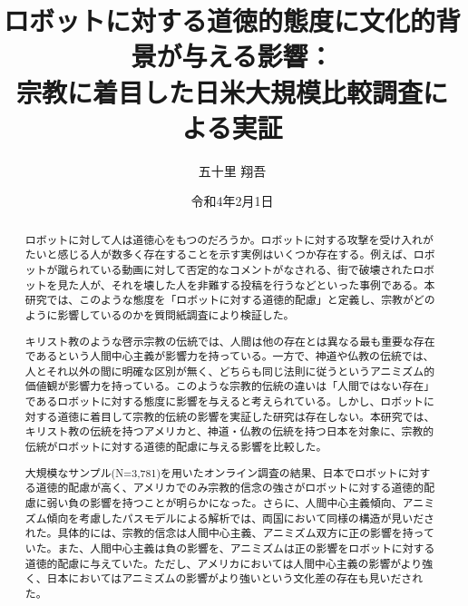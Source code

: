 \documentclass[a4j,12pt]{jreport}
\title{ロボットに対する道徳的態度に文化的背景が与える影響：\\宗教に着目した日米大規模比較調査による実証}
\author{五十里 翔吾}
\date{令和4年2月1日}
\begin{document}
\maketitle

\begin{abstract}



ロボットに対して人は道徳心をもつのだろうか。ロボットに対する攻撃を受け入れがたいと感じる人が数多く存在することを示す実例はいくつか存在する。例えば、ロボットが蹴られている動画に対して否定的なコメントがなされる、街で破壊されたロボットを見た人が、それを壊した人を非難する投稿を行うなどといった事例である。本研究では、このような態度を「ロボットに対する道徳的配慮」と定義し、宗教がどのように影響しているのかを質問紙調査により検証した。


キリスト教のような啓示宗教の伝統では、人間は他の存在とは異なる最も重要な存在であるという人間中心主義が影響力を持っている。一方で、神道や仏教の伝統では、人とそれ以外の間に明確な区別が無く、どちらも同じ法則に従うというアニミズム的価値観が影響力を持っている。このような宗教的伝統の違いは「人間ではない存在」であるロボットに対する態度に影響を与えると考えられている。しかし、ロボットに対する道徳に着目して宗教的伝統の影響を実証した研究は存在しない。本研究では、キリスト教の伝統を持つアメリカと、神道・仏教の伝統を持つ日本を対象に、宗教的伝統がロボットに対する道徳的配慮に与える影響を比較した。

大規模なサンプル(N=3,781)を用いたオンライン調査の結果、日本でロボットに対する道徳的配慮が高く、アメリカでのみ宗教的信念の強さがロボットに対する道徳的配慮に弱い負の影響を持つことが明らかになった。さらに、人間中心主義傾向、アニミズム傾向を考慮したパスモデルによる解析では、両国において同様の構造が見いだされた。具体的には、宗教的信念は人間中心主義、アニミズム双方に正の影響を持っていた。また、人間中心主義は負の影響を、アニミズムは正の影響をロボットに対する道徳的配慮に与えていた。ただし、アメリカにおいては人間中心主義の影響がより強く、日本においてはアニミズムの影響がより強いという文化差の存在も見いだされた。

\end{abstract}

\setcounter{page}{0}

\tableofcontents




\listoffigures

\listoftables

\newpage

\end{document}
